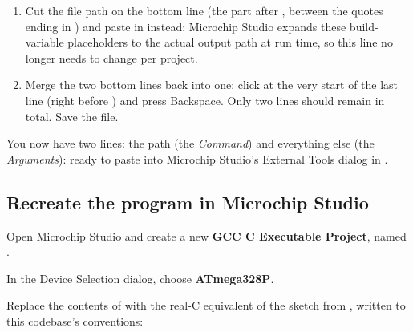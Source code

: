 
\begin{enumerate}[resume]
  \item Cut the file path on the bottom line (the part after , between the quotes
    ending in ) and paste in  instead:
    Microchip Studio expands these build-variable placeholders to the actual output path at run
    time, so this line no longer needs to change per project.
  \item Merge the two bottom lines back into one: click at the very start of the last line (right
    before ) and press Backspace. Only two lines should remain in total. Save the
    file.
\end{enumerate}



\noindent You now have two lines: the  path (the \emph{Command}) and everything
else (the \emph{Arguments}): ready to paste into Microchip Studio's External Tools dialog in
.

\subsection{Recreate the program in Microchip Studio}
\label{c2:c:7}
Open Microchip Studio and create a new \textbf{GCC C Executable Project}, named .


\noindent In the Device Selection dialog, choose \textbf{ATmega328P}.


\noindent Replace the contents of  with the real-C equivalent of the sketch from
, written to this codebase's conventions:

